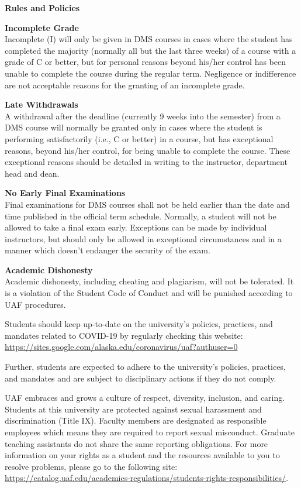 \documentclass[12pt]{article}
\renewcommand{\emph}[1]{\textsf{\textbf{#1}}}
\newcommand{\localhead}[1]{\par\smallskip\textbf{#1}\nobreak\\}%
\def\heading#1{\localhead{\large\emph{#1}}}
\def\subheading#1{\localhead{\emph{#1}}}
\begin{document}
\heading{Rules and Policies}
\vskip -20pt

\subheading{Incomplete Grade} 
Incomplete (I) will only be given in
  DMS courses in cases where
  the student has completed the majority (normally all but the last
  three weeks) of a course with a grade of C or better, but for
  personal reasons beyond his/her control has been unable to complete
  the course during the regular term. Negligence or indifference are
  not acceptable reasons for the granting of an incomplete
  grade. 

\subheading{Late Withdrawals} 
A withdrawal after the deadline
  (currently 9 weeks into the semester) from a DMS course will
  normally be granted only in cases where the student is performing
  satisfactorily (i.e., C or better) in a course, but has exceptional
  reasons, beyond his/her control, for being unable to complete the
  course. These exceptional reasons should be detailed in writing to
  the instructor, department head and dean.

\subheading{No Early Final Examinations}
Final examinations for DMS
  courses shall not be held earlier than the date and time published
  in the official term schedule. Normally, a student will not be
  allowed to take a final exam early. Exceptions can be made by
  individual instructors, but should only be allowed in exceptional
  circumstances and in a manner which doesn't endanger the security of
  the exam.

\subheading{Academic Dishonesty}
Academic dishonesty, including cheating and plagiarism, will not
be tolerated.  It is a violation of the Student Code of Conduct
and will be punished according to UAF procedures.

 
  Students should keep up-to-date on the university's policies, practices, and mandates related to COVID-19 by regularly checking this website: \url{https://sites.google.com/alaska.edu/coronavirus/uaf?authuser=0}

Further, students are expected to adhere to the university's policies, practices, and mandates and are subject to disciplinary actions if they do not comply.

 UAF embraces and grows a culture of respect, diversity, inclusion, and caring. Students at this university are protected against sexual harassment and discrimination (Title IX). Faculty members are designated as responsible employees which means they are required to report sexual misconduct. Graduate teaching assistants do not share the same reporting obligations. For more information on your rights as a student and the resources available to you to resolve problems, please go to the following site: \url{https://catalog.uaf.edu/academics-regulations/students-rights-responsibilities/}.
\end{document}
